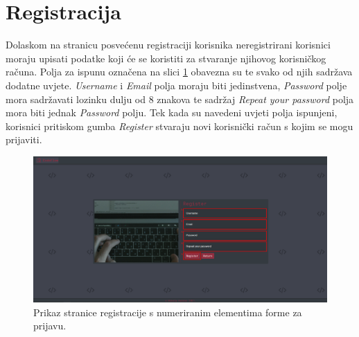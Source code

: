 \documentclass[times, utf8, zavrsni]{fer}
\begin{document}
		\section{Registracija}
		Dolaskom na stranicu posvećenu registraciji korisnika neregistrirani korisnici moraju upisati podatke koji će se koristiti za stvaranje njihovog korisničkog računa. Polja za ispunu označena na slici \ref{fig:register} obavezna su te svako od njih sadržava dodatne uvjete. \textit{Username} i \textit{Email} polja moraju biti jedinstvena, \textit{Password} polje mora sadržavati lozinku dulju od 8 znakova te sadržaj \textit{Repeat your password} polja mora biti jednak \textit{Password} polju. Tek kada su navedeni uvjeti polja ispunjeni, korisnici pritiskom gumba \textit{Register} stvaraju novi korisnički račun s kojim se mogu prijaviti.
		\begin{figure}[htb]
			\centering
			\includegraphics[width=\linewidth]{pictures/koristenje/Registracija.png}
			\caption{Prikaz stranice registracije s numeriranim elementima forme za prijavu.}
			\label{fig:register}
		\end{figure}
	
\end{document}
